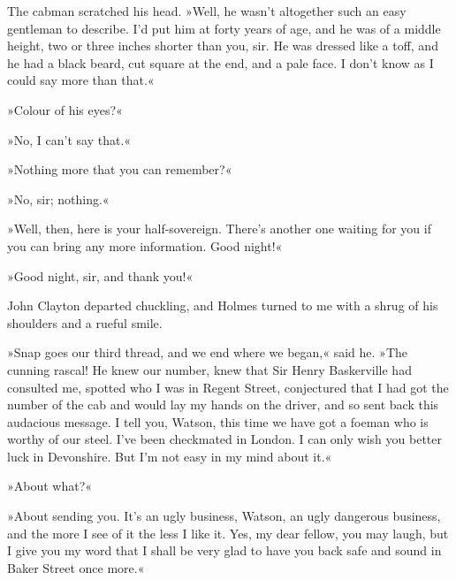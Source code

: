 The cabman scratched his head. »Well, he wasn't altogether such an easy gentleman to describe. I'd put him at forty years of age, and he was of a middle height, two or three inches shorter than you, sir. He was dressed like a toff, and he had a black beard, cut square at the end, and a pale face. I don't know as I could say more than that.«

»Colour of his eyes?«

»No, I can't say that.«

»Nothing more that you can remember?«

»No, sir; nothing.«

»Well, then, here is your half-sovereign. There's another one waiting for you if you can bring any more information. Good night!«

»Good night, sir, and thank you!«

John Clayton departed chuckling, and Holmes turned to me with a shrug of his shoulders and a rueful smile.

»Snap goes our third thread, and we end where we began,« said he. »The cunning rascal! He knew our number, knew that Sir Henry Baskerville had consulted me, spotted who I was in Regent Street, conjectured that I had got the number of the cab and would lay my hands on the driver, and so sent back this audacious message. I tell you, Watson, this time we have got a foeman who is worthy of our steel. I've been checkmated in London. I can only wish you better luck in Devonshire. But I'm not easy in my mind about it.«

»About what?«

»About sending you. It's an ugly business, Watson, an ugly dangerous business, and the more I see of it the less I like it. Yes, my dear fellow, you may laugh, but I give you my word that I shall be very glad to have you back safe and sound in Baker Street once more.«
